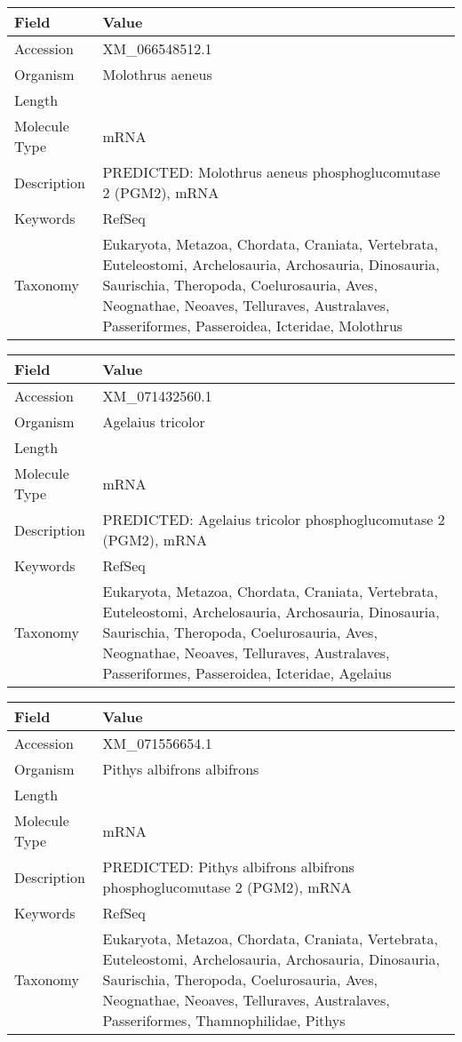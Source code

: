 \documentclass[10pt]{article}
\begin{document}
\vspace{1em}
{\footnotesize
\begin{longtable}{>{\raggedright\arraybackslash}p{4.5cm} >{\raggedright\arraybackslash}p{11.5cm}}
\textbf{Field} & \textbf{Value} \\
\hline
Accession & XM\_066548512.1 \\
Organism & Molothrus aeneus \\
Length & 2229 \\
Molecule Type & mRNA \\
Description & PREDICTED: Molothrus aeneus phosphoglucomutase 2 (PGM2), mRNA \\
Keywords & RefSeq \\
Taxonomy & Eukaryota, Metazoa, Chordata, Craniata, Vertebrata, Euteleostomi, Archelosauria, Archosauria, Dinosauria, Saurischia, Theropoda, Coelurosauria, Aves, Neognathae, Neoaves, Telluraves, Australaves, Passeriformes, Passeroidea, Icteridae, Molothrus \\
\end{longtable}
}

\vspace{1em}
{\footnotesize
\begin{longtable}{>{\raggedright\arraybackslash}p{4.5cm} >{\raggedright\arraybackslash}p{11.5cm}}
\textbf{Field} & \textbf{Value} \\
\hline
Accession & XM\_071432560.1 \\
Organism & Agelaius tricolor \\
Length & 2542 \\
Molecule Type & mRNA \\
Description & PREDICTED: Agelaius tricolor phosphoglucomutase 2 (PGM2), mRNA \\
Keywords & RefSeq \\
Taxonomy & Eukaryota, Metazoa, Chordata, Craniata, Vertebrata, Euteleostomi, Archelosauria, Archosauria, Dinosauria, Saurischia, Theropoda, Coelurosauria, Aves, Neognathae, Neoaves, Telluraves, Australaves, Passeriformes, Passeroidea, Icteridae, Agelaius \\
\end{longtable}
}

\vspace{1em}
{\footnotesize
\begin{longtable}{>{\raggedright\arraybackslash}p{4.5cm} >{\raggedright\arraybackslash}p{11.5cm}}
\textbf{Field} & \textbf{Value} \\
\hline
Accession & XM\_071556654.1 \\
Organism & Pithys albifrons albifrons \\
Length & 2240 \\
Molecule Type & mRNA \\
Description & PREDICTED: Pithys albifrons albifrons phosphoglucomutase 2 (PGM2), mRNA \\
Keywords & RefSeq \\
Taxonomy & Eukaryota, Metazoa, Chordata, Craniata, Vertebrata, Euteleostomi, Archelosauria, Archosauria, Dinosauria, Saurischia, Theropoda, Coelurosauria, Aves, Neognathae, Neoaves, Telluraves, Australaves, Passeriformes, Thamnophilidae, Pithys \\
\end{longtable}
}
\end{document}
